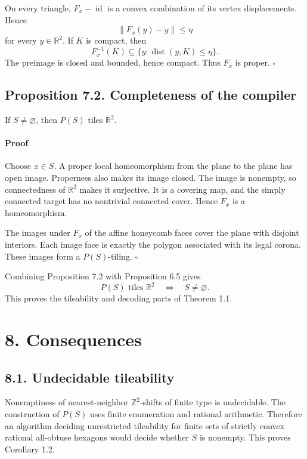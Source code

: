 \documentclass[11pt]{article}
\begin{document}
On every triangle, \(F_x-\operatorname{id}\) is a convex combination of its
vertex displacements. Hence
\[
  \lVert F_x(y)-y\rVert\leq\eta
\]
for every \(y\in\mathbb R^2\). If \(K\) is compact, then
\[
  F_x^{-1}(K)\subseteq
  \{y:\operatorname{dist}(y,K)\leq\eta\}.
\]
The preimage is closed and bounded, hence compact. Thus \(F_x\) is proper.
\(\square\)

\subsection*{Proposition 7.2. Completeness of the compiler}

If \(S\neq\varnothing\), then \(P(S)\) tiles \(\mathbb R^2\).

\paragraph{Proof}

Choose \(x\in S\). A proper local homeomorphism from the plane to the plane
has open image. Properness also makes its image closed. The image is
nonempty, so connectedness of \(\mathbb R^2\) makes it surjective. It is a
covering map, and the simply connected target has no nontrivial connected
cover. Hence \(F_x\) is a homeomorphism.

The images under \(F_x\) of the affine honeycomb faces cover the plane with
disjoint interiors. Each image face is exactly the polygon associated with
its legal corona. These images form a \(P(S)\)-tiling. \(\square\)

Combining Proposition 7.2 with Proposition 6.5 gives
\[
  P(S)\text{ tiles }\mathbb R^2
  \quad\Longleftrightarrow\quad
  S\neq\varnothing.
\]
This proves the tileability and decoding parts of Theorem 1.1.

\section*{8. Consequences}

\subsection*{8.1. Undecidable tileability}

Nonemptiness of nearest-neighbor \(\mathbb Z^2\)-shifts of finite type is
undecidable. The construction of \(P(S)\) uses finite enumeration and
rational arithmetic. Therefore an algorithm deciding unrestricted
tileability for finite sets of strictly convex rational all-obtuse hexagons
would decide whether \(S\) is nonempty. This proves Corollary 1.2.
\end{document}
